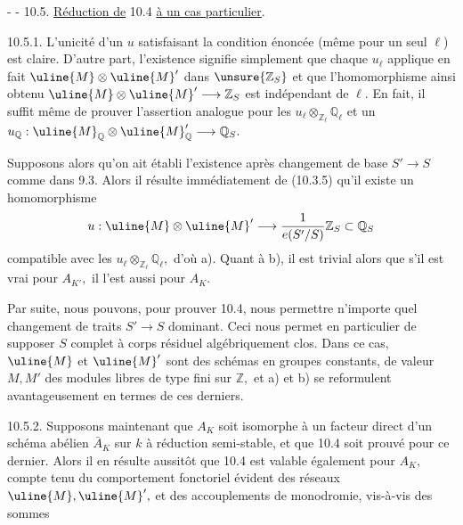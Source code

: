 -  -
10.5. \uline{Réduction de} 10.4 \uline{à un cas particulier}.

10.5.1. L'unicité d'un \(u\) satisfaisant la condition énoncée (même pour un seul \(\ell\)) est claire. D'autre part, l'existence signifie simplement que chaque \(u_\ell\) applique en fait \(\uline{M}\otimes\uline{M}'\) dans \(\unsure{\mathbb Z_S}\) et que l'homomorphisme ainsi obtenu \(\uline{M}\otimes\uline{M}'\longrightarrow\mathbb Z_S\) est indépendant de \(\ell.\) En fait, il suffit même de prouver l'assertion analogue pour les \(u_\ell\otimes_{\mathbb Z_\ell}\mathbb Q_\ell\) et un \(u_{\mathbb Q}:\uline{M}_{\mathbb Q}\otimes\uline{M}'_{\mathbb Q}\longrightarrow\mathbb Q_S.\)

Supposons alors qu'on ait établi l'existence après changement de base \(S'\longrightarrow S\) comme dans 9.3. Alors il résulte immédiatement de (10.3.5) qu'il existe un homomorphisme
\[
u:\uline{M}\otimes\uline{M}'\longrightarrow\frac{1}{e(S'/S)}\mathbb Z_S\subset\mathbb Q_S
\]
compatible avec les \(u_\ell\otimes_{\mathbb Z_\ell}\mathbb Q_\ell,\) d'où a). Quant à b), il est trivial alors que s'il est vrai pour \(A_{K'},\) il l'est aussi pour \(A_K.\)

Par suite, nous pouvons, pour prouver 10.4, nous permettre n'importe quel changement de traits \(S'\longrightarrow S\) dominant. Ceci nous permet en particulier de supposer \(S\) complet à corps résiduel algébriquement clos. Dans ce cas, \(\uline{M}\) et \(\uline{M}'\) sont des schémas en groupes constants, de valeur \(M,M'\) des modules libres de type fini sur \(\mathbb Z,\) et a) et b) se reformulent avantageusement en termes de ces derniers.

10.5.2. Supposons maintenant que \(A_K\) soit isomorphe à un facteur direct d'un schéma abélien \(\bar A_K\) sur \(k\) à réduction semi-stable, et que 10.4 soit prouvé pour ce dernier. Alors il en résulte aussitôt que 10.4 est valable également pour \(A_K,\) compte tenu du comportement fonctoriel évident des réseaux \(\uline{M},\uline{M}',\) et des accouplements de monodromie, vis-à-vis des sommes

